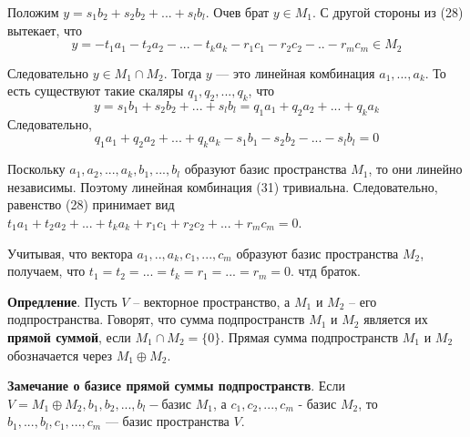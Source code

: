 \documentclass[a4paper]{article}
\begin{document}
\begin{hproof}
        Положим $y = s_1b_2 +s_2b_2 + ... + s_lb_l$. Очев брат $y \in M_1$. С другой стороны из (28) вытекает, что \begin{equation}
                                                                                                                  y = -t_1a_1 - t_2a_2 -... -t_ka_k - r_1c_1 -r_2c_2 -.. -r_mc_m \in M_2
        \end{equation}

        Следовательно $y \in M_1 \cap M_2$. Тогда $y$ --- это линейная комбинация $a_1, ..., a_k$. То есть существуют такие скаляры $q_1, q_2, ..., q_k$, что
        \begin{equation}
            y = s_1b_1+s_2b_2+...+s_lb_l = q_1a_1 + q_2a_2 + ... + q_ka_k
        \end{equation}
        Следовательно,
        \begin{equation}
            q_1a_1 + q_2a_2 + ... + q_ka_k - s_1b_1 - s_2b_2-... - s_lb_l = 0
        \end{equation}

        Поскольку $a_1, a_2, ..., a_k, b_1, ..., b_l$ образуют базис пространства $M_1$, то они линейно независимы. Поэтому линейная комбинация (31) тривиальна. Следовательно, равенство (28) принимает вид $t_1a_1 +t_2a_2 + ... + t_ka_k +r_1c_1 + r_2c_2 + ... + r_mc_m = 0$.

        Учитывая, что вектора $a_1, .., a_k, c_1, ..., c_m$ образуют базис пространства $M_2$, получаем, что $t_1 = t_2 = ... = t_k = r_1 = ... = r_m = 0$. чтд браток.
    \end{hproof}

    \newpage \begin{center}
                 \begin{Large}
                 \end{Large}
    \end{center}

    \textbf{Опредление}. Пусть $V$ – векторное пространство, а $M_1$ и $M_2$ – его подпространства.
    Говорят, что сумма подпространств $M_1$ и $M_2$ является их \textbf{прямой суммой},
    если $M_1 \cap M_2 =\{ 0 \}$. Прямая сумма подпространств $M_1$ и $M_2$
    обозначается через $M_1 \oplus M_2$.

    \begin{htheorem}
        \textbf{Замечание о базисе прямой суммы подпространств}. Если $V = M_1 \oplus M_2, b_1, b_2, ..., b_l - $базис $M_1$, а $c_1, c_2, ..., c_m$ - базис $M_2$, то $b_1, ..., b_l, c_1, ..., c_m$ --- базис пространства $V$.
    \end{htheorem}
\end{document}
